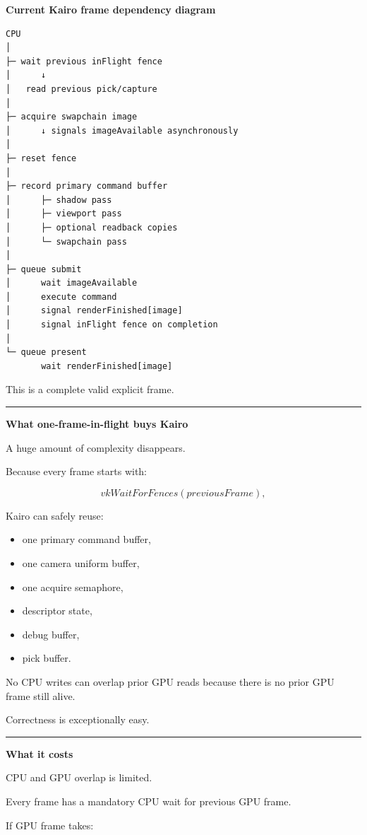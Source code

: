 \textbf{Current Kairo frame dependency diagram}

\begin{verbatim}
CPU
│
├─ wait previous inFlight fence
│      ↓
│   read previous pick/capture
│
├─ acquire swapchain image
│      ↓ signals imageAvailable asynchronously
│
├─ reset fence
│
├─ record primary command buffer
│      ├─ shadow pass
│      ├─ viewport pass
│      ├─ optional readback copies
│      └─ swapchain pass
│
├─ queue submit
│      wait imageAvailable
│      execute command
│      signal renderFinished[image]
│      signal inFlight fence on completion
│
└─ queue present
       wait renderFinished[image]
\end{verbatim}

This is a complete valid explicit frame.

\begin{center}\rule{0.5\linewidth}{0.5pt}\end{center}

\textbf{What one-frame-in-flight buys Kairo}

A huge amount of complexity disappears.

Because every frame starts with:

\[
vkWaitForFences(previousFrame),
\]

Kairo can safely reuse:

\begin{itemize}
\tightlist
\item
  one primary command buffer,
\item
  one camera uniform buffer,
\item
  one acquire semaphore,
\item
  descriptor state,
\item
  debug buffer,
\item
  pick buffer.
\end{itemize}

No CPU writes can overlap prior GPU reads because there is no prior GPU frame still alive.

Correctness is exceptionally easy.

\begin{center}\rule{0.5\linewidth}{0.5pt}\end{center}

\textbf{What it costs}

CPU and GPU overlap is limited.

Every frame has a mandatory CPU wait for previous GPU frame.

If GPU frame takes:

